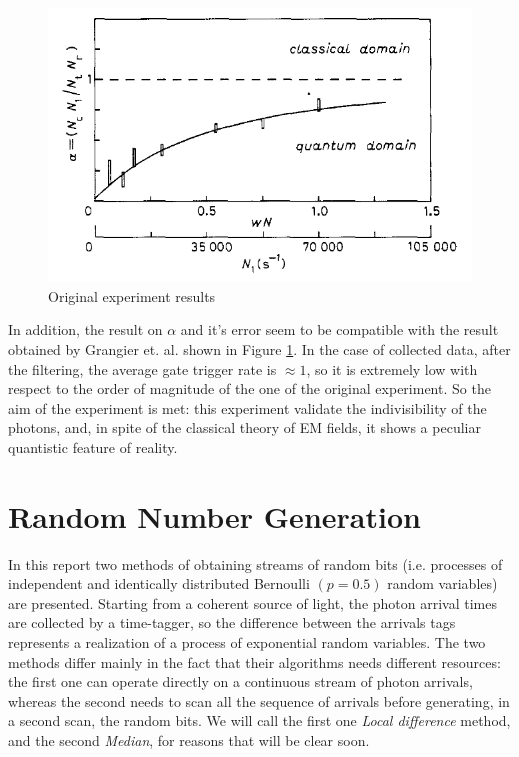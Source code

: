 \documentclass[10pt, final]{article}
\begin{document}
\begin{multicols}{2}
\begin{mdframed}
    \begin{figure}[H]
        \centering
        \includegraphics[width = \textwidth]{../images/alpha.png}
        \caption{Original experiment results}
        \label{alpha}
    \end{figure}
\end{mdframed}
In addition, the result on $\alpha$ and it's error seem to be compatible with the result obtained by Grangier et. al. shown in Figure \ref{alpha}. In the case of collected data, after the filtering, the average gate trigger rate is $\approx 1$, so it is extremely low with respect to the order of magnitude of the one of the original experiment.
So the aim of the experiment is met: this experiment validate the indivisibility of the photons, and, in spite of the classical theory of EM fields, it shows a peculiar quantistic feature of reality. 

\section{Random Number Generation}
In this report two methods of obtaining streams of random bits (i.e. 
 processes of independent and identically distributed Bernoulli $(p = 0.5)$ random variables) are presented.
 Starting from a coherent source of light, the photon arrival times are collected by a time-tagger, so the difference between the arrivals tags represents a realization of a process of exponential random variables. 
 The two methods differ mainly in the fact that their algorithms needs different resources: the first one can operate directly on a continuous stream of photon arrivals, whereas the second needs to scan all the sequence of arrivals before generating, in a second scan, the random bits. We will call the first one \emph{Local difference} method, and the second \emph{Median}, for reasons that will be clear soon.

\end{multicols}
\end{document}
